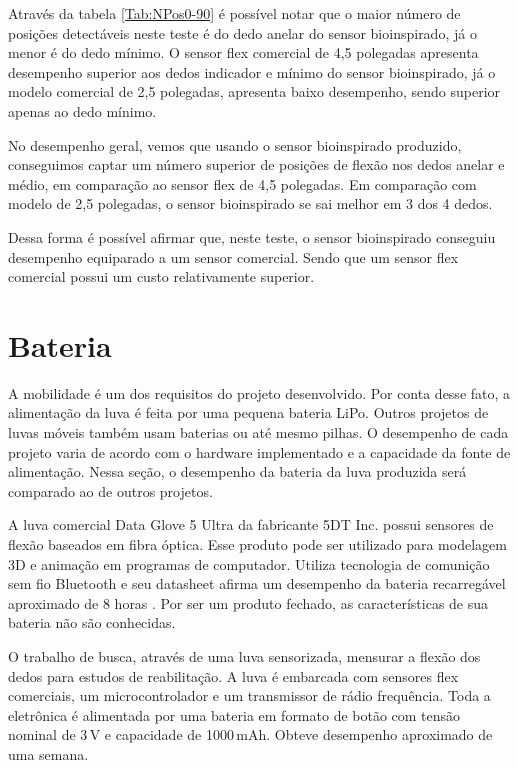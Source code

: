 \documentclass[
	12pt,				%
	openright,			%
	oneside,			%
	a4paper,			%
	english,			%
	brazil				%
	]{abntex2}
\begin{document}
		Através da tabela \ref{Tab:NPos0-90} é possível notar que o maior número de posições detectáveis neste teste é do dedo anelar do sensor bioinspirado, já o menor é do dedo mínimo. O sensor flex comercial de 4,5 polegadas apresenta desempenho superior aos dedos indicador e mínimo do sensor bioinspirado, já o modelo comercial de 2,5 polegadas, apresenta baixo desempenho, sendo superior apenas ao dedo mínimo.

		No desempenho geral, vemos que usando o sensor bioinspirado produzido, conseguimos captar um número superior de posições de flexão nos dedos anelar e médio, em comparação ao sensor flex de 4,5 polegadas. Em comparação com modelo de 2,5 polegadas, o sensor bioinspirado se sai melhor em 3 dos 4 dedos.

		Dessa forma é possível afirmar que, neste teste, o sensor bioinspirado conseguiu desempenho equiparado a um sensor comercial. Sendo que um sensor flex comercial possui um custo relativamente superior.




			\section{Bateria}

			A mobilidade é um dos requisitos do projeto desenvolvido. Por conta desse fato, a alimentação da luva é feita por uma pequena bateria LiPo. Outros projetos de luvas móveis também usam baterias ou até mesmo pilhas. O desempenho de cada projeto varia de acordo com o hardware implementado e a capacidade da fonte de alimentação. Nessa seção, o desempenho da bateria da luva produzida será comparado ao de outros projetos.

			A luva comercial Data Glove 5 Ultra da fabricante 5DT Inc. possui sensores de flexão baseados em fibra óptica. Esse produto pode ser utilizado para modelagem 3D e animação em programas de computador. Utiliza tecnologia de comunição sem fio Bluetooth e seu datasheet afirma um desempenho da bateria recarregável aproximado de 8 horas \cite{5DT-ultra}. Por ser um produto fechado, as características de sua bateria não são conhecidas.

			O trabalho de \cite{michela2013rehab} busca, através de uma luva sensorizada, mensurar a flexão dos dedos para estudos de reabilitação. A luva é embarcada com sensores flex comerciais, um microcontrolador e um transmissor de rádio frequência. Toda a eletrônica é alimentada por uma bateria em formato de botão com tensão nominal de 3$\,$V e capacidade de 1000$\,$mAh. Obteve desempenho aproximado de uma semana.
			
\end{document}
